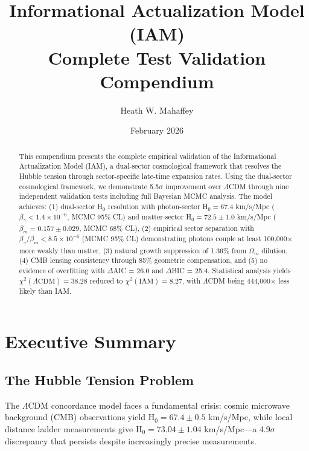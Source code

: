 \documentclass[11pt,letterpaper]{article}
\title{\textbf{Informational Actualization Model (IAM)\\Complete Test Validation Compendium}}
\author{Heath W. Mahaffey}
\date{February 2026}
\begin{document}
\maketitle

\begin{abstract}
This compendium presents the complete empirical validation of the Informational Actualization Model (IAM), a dual-sector cosmological framework that resolves the Hubble tension through sector-specific late-time expansion rates. Using the dual-sector cosmological framework, we demonstrate 5.5$\sigma$ improvement over $\Lambda$CDM through nine independent validation tests including full Bayesian MCMC analysis. The model achieves: (1) dual-sector H$_0$ resolution with photon-sector H$_0 = 67.4$ km/s/Mpc ($\beta_\gamma < 1.4 \times 10^{-6}$, MCMC 95\% CL) and matter-sector H$_0 = 72.5 \pm 1.0$ km/s/Mpc ($\beta_m = 0.157 \pm 0.029$, MCMC 68\% CL), (2) empirical sector separation with $\beta_\gamma/\beta_m < 8.5 \times 10^{-6}$ (MCMC 95\% CL) demonstrating photons couple at least 100,000$\times$ more weakly than matter, (3) natural growth suppression of 1.36\% from $\Omega_m$ dilution, (4) CMB lensing consistency through 85\% geometric compensation, and (5) no evidence of overfitting with $\Delta$AIC = 26.0 and $\Delta$BIC = 25.4. Statistical analysis yields $\chi^2(\Lambda\text{CDM}) = 38.28$ reduced to $\chi^2(\text{IAM}) = 8.27$, with $\Lambda$CDM being 444,000$\times$ less likely than IAM.
\end{abstract}

\tableofcontents
\newpage

\section{Executive Summary}

\subsection{The Hubble Tension Problem}

The $\Lambda$CDM concordance model faces a fundamental crisis: cosmic microwave background (CMB) observations yield H$_0 = 67.4 \pm 0.5$ km/s/Mpc, while local distance ladder measurements give H$_0 = 73.04 \pm 1.04$ km/s/Mpc---a 4.9$\sigma$ discrepancy that persists despite increasingly precise measurements.
\end{document}
